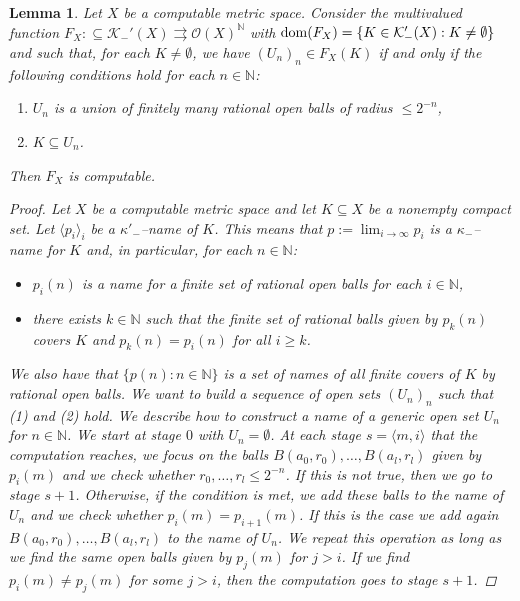 \documentclass[a4paper]{amsart}
\def\KK{{\mathcal K}}
\def\OO{{\mathcal O}}
\def\IN{{\mathbb{N}}}
\def\In{\subseteq}
\def\mto{\rightrightarrows}
\def\dom{{\rm dom}}
\newtheorem{lemma}[theorem]{Lemma}
\theoremstyle{definition}
\begin{document}
\begin{lemma}
\label{lem1}
Let $X$ be a computable metric space. Consider the multivalued function
$F_X:\In\KK_-'(X)\mto\OO(X)^\IN$ with $\dom(F_X)=\{K\in\KK_-'(X):K\neq\emptyset\}$
and such that, for each $K\neq\emptyset$, we have $(U_n)_n\in F_X(K)$ if and only if the following conditions hold for each $n\in\IN$:
\begin{enumerate}
\item $U_n$ is a union of finitely many rational open balls of radius $\leq 2^{-n}$,
\item $K\subseteq U_n $.
\end{enumerate}
Then $F_X$ is computable.
\begin{proof}
Let $X$ be a computable metric space and let $K\subseteq X$ be a nonempty compact set. Let $\langle p_i\rangle_i$ be a $\kappa'_-$--name of $K$.
This means that $p:=\lim_{i\to\infty}p_i$ is a $\kappa_-$--name for $K$ and, in particular, for each $n\in\IN$:			 	
\begin{itemize}
\item  $p_i(n)$ is a name for a finite set of rational open balls for each $i\in\IN$,
\item there exists $k\in\IN$ such that the finite set of rational balls given by $p_k(n)$ covers $K$ and ${p_k(n)=p_i(n)}$ for all $i\geq k$.
\end{itemize}
We also have that $\{p(n):n\in\IN\}$ is a set of names of all finite covers of $K$ by rational open balls.
We want to build a sequence of open sets $(U_n)_n$ such that (1) and (2) hold.
We describe how  to construct a name of a generic open set $U_n$ for $n\in\IN$.
We start at stage $0$ with $U_n=\emptyset$.
At each stage $s=\langle m,i\rangle$ that the computation reaches, we focus on the balls $B(a_0,r_0),\dots,B(a_l,r_l)$ given by $p_i(m)$
and we check whether $r_0,\dots,r_l\leq 2^{-n}$. If this is not true, then we go to stage $s+1$.
Otherwise, if the condition is met, we add these balls to the name of $U_n$  and we check whether $p_i(m)=p_{i+1}(m)$.
If this is the case we add again $B(a_0,r_0),\dots,B(a_l,r_l)$ to the name of $U_n$.
We repeat this operation as long as we find the same open balls given by $p_j(m)$ for $j>i$.
If we find $p_i(m)\neq p_j(m)$ for some $j>i$, then the computation goes to stage $s+1$.


\end{proof}
\end{lemma}
\end{document}
